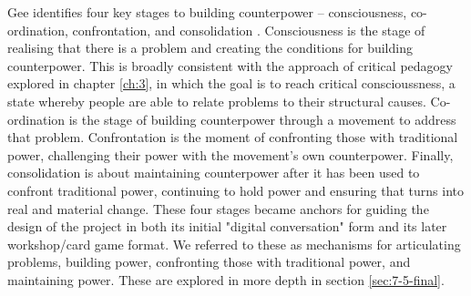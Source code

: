 Gee identifies four key stages to building counterpower – consciousness, co-ordination, confrontation, and consolidation \citep[130]{gee_counterpower:_2011}. Consciousness is the stage of realising that there is a problem and creating the conditions for building counterpower. This is broadly consistent with the approach of critical pedagogy explored in chapter \ref{ch:3}, in which the goal is to reach critical conscioussness,  a state whereby people are able to relate problems to their structural causes. Co-ordination is the stage of building counterpower through a movement to address that problem. Confrontation is the moment of confronting those with traditional power, challenging their power with the movement’s own counterpower. Finally, consolidation is about maintaining counterpower after it has been used to confront traditional power, continuing to hold power and ensuring that turns into real and material change. These four stages became anchors for guiding the design of the project in both its initial "digital conversation" form and its later workshop/card game format. We referred to these as mechanisms for articulating problems, building power, confronting those with traditional power, and maintaining power. These are explored in more depth in section \ref{sec:7-5-final}. 

